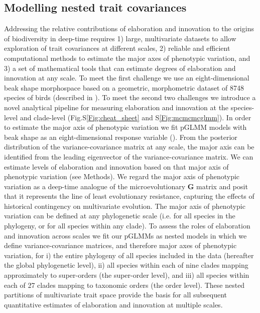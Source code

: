 \documentclass[12pt,letterpaper]{article}
\begin{document}
\subsection{Modelling nested trait covariances}
Addressing the relative contributions of elaboration and innovation to the origins of biodiversity in deep-time requires
1) large, multivariate datasets to allow exploration of trait covariances at different scales,
2) reliable and efficient computational methods to estimate the major axes of phenotypic variation,
and 3) a set of mathematical tools that can estimate degrees of elaboration and innovation at any scale.
To meet the first challenge we use an eight-dimensional beak shape morphospace based on a geometric, morphometric dataset of 8748 species of birds (described in \cite{hughes2022global}).
To meet the second two challenges we introduce a novel analytical pipeline for measuring elaboration and innovation at the species-level and clade-level (Fig.S\ref{Fig:cheat_sheet} and S\ref{Fig:mcmcmcglmm}).
In order to estimate the major axis of phenotypic variation we fit pGLMM models with beak shape as an eight-dimensional response variable (\cite{MCMCglmm}).
From the posterior distribution of the variance-covariance matrix at any scale, the major axis can be identified from the leading eigenvector of the variance-covariance matrix.
We can estimate levels of elaboration and innovation based on that major axis of phenotypic variation (see Methods).
We regard the major axis of phenotypic variation as a deep-time analogue of the microevolutionary \textbf{G} matrix \cite{robinson2013quantifying} and posit that it represents the line of least evolutionary resistance, capturing the effects of historical contingency on multivariate evolution.
The major axis of phenotypic variation can be defined at any phylogenetic scale (i.e. for all species in the phylogeny, or for all species within any clade).
To assess the roles of elaboration and innovation across scales we fit our pGLMMs as nested models in which we define variance-covariance matrices, and therefore major axes of phenotypic variation, for
i) the entire phylogeny of all species included in the data (hereafter the global phylogenetic level),
ii) all species within each of nine clades mapping approximately to super-orders (the super-order level),
and iii) all species within each of 27 clades mapping to taxonomic orders (the order level).
These nested partitions of multivariate trait space provide the basis for all subsequent quantitative estimates of elaboration and innovation at multiple scales.
\end{document}
